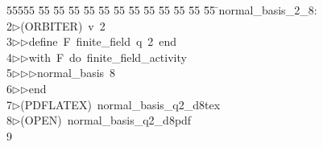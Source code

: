 %
%
\begin{tabbing}
55555 \= 55 \= 55 \= 55 \= 55 \= 55 \= 55 \= 55 \= 55 \= 55 \= 55 \= 55 \= 55 \= \>normal\_basis\_2\_8:\\[0pt]
2\>$\triangleright$\>(ORBITER)\ v\ 2\ \\[0pt]
3\>$\triangleright$\>$\triangleright$\>define\ F\ finite\_field\ q\ 2\ end\ \\[0pt]
4\>$\triangleright$\>$\triangleright$\>with\ F\ do\ finite\_field\_activity\ \\[0pt]
5\>$\triangleright$\>$\triangleright$\>$\triangleright$\>normal\_basis\ 8\ \\[0pt]
6\>$\triangleright$\>$\triangleright$\>end\\[0pt]
7\>$\triangleright$\>(PDFLATEX)\ normal\_basis\_q2\_d8tex\\[0pt]
8\>$\triangleright$\>(OPEN)\ normal\_basis\_q2\_d8pdf\\[0pt]
9\>\end{tabbing}
